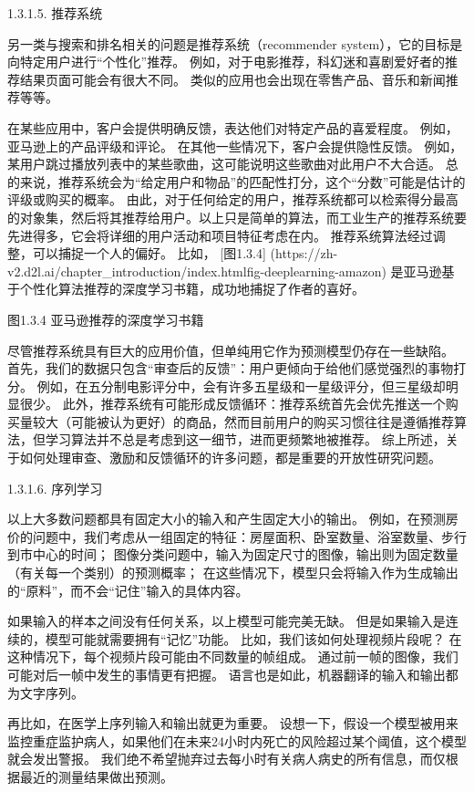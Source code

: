  1.3.1.5. 推荐系统

另一类与搜索和排名相关的问题是推荐系统（recommender system），它的目标是向特定用户进行“个性化”推荐。 例如，对于电影推荐，科幻迷和喜剧爱好者的推荐结果页面可能会有很大不同。 类似的应用也会出现在零售产品、音乐和新闻推荐等等。

在某些应用中，客户会提供明确反馈，表达他们对特定产品的喜爱程度。 例如，亚马逊上的产品评级和评论。 在其他一些情况下，客户会提供隐性反馈。 例如，某用户跳过播放列表中的某些歌曲，这可能说明这些歌曲对此用户不大合适。 总的来说，推荐系统会为“给定用户和物品”的匹配性打分，这个“分数”可能是估计的评级或购买的概率。 由此，对于任何给定的用户，推荐系统都可以检索得分最高的对象集，然后将其推荐给用户。以上只是简单的算法，而工业生产的推荐系统要先进得多，它会将详细的用户活动和项目特征考虑在内。 推荐系统算法经过调整，可以捕捉一个人的偏好。 比如， [图1.3.4]
(https://zh-v2.d2l.ai/chapter\_introduction/index.htmlfig-deeplearning-amazon) 
是亚马逊基于个性化算法推荐的深度学习书籍，成功地捕捉了作者的喜好。


图1.3.4 亚马逊推荐的深度学习书籍

尽管推荐系统具有巨大的应用价值，但单纯用它作为预测模型仍存在一些缺陷。 首先，我们的数据只包含“审查后的反馈”：用户更倾向于给他们感觉强烈的事物打分。 例如，在五分制电影评分中，会有许多五星级和一星级评分，但三星级却明显很少。 此外，推荐系统有可能形成反馈循环：推荐系统首先会优先推送一个购买量较大（可能被认为更好）的商品，然而目前用户的购买习惯往往是遵循推荐算法，但学习算法并不总是考虑到这一细节，进而更频繁地被推荐。 综上所述，关于如何处理审查、激励和反馈循环的许多问题，都是重要的开放性研究问题。

 1.3.1.6. 序列学习

以上大多数问题都具有固定大小的输入和产生固定大小的输出。 例如，在预测房价的问题中，我们考虑从一组固定的特征：房屋面积、卧室数量、浴室数量、步行到市中心的时间； 图像分类问题中，输入为固定尺寸的图像，输出则为固定数量（有关每一个类别）的预测概率； 在这些情况下，模型只会将输入作为生成输出的“原料”，而不会“记住”输入的具体内容。

如果输入的样本之间没有任何关系，以上模型可能完美无缺。 但是如果输入是连续的，模型可能就需要拥有“记忆”功能。 比如，我们该如何处理视频片段呢？ 在这种情况下，每个视频片段可能由不同数量的帧组成。 通过前一帧的图像，我们可能对后一帧中发生的事情更有把握。 语言也是如此，机器翻译的输入和输出都为文字序列。

再比如，在医学上序列输入和输出就更为重要。 设想一下，假设一个模型被用来监控重症监护病人，如果他们在未来24小时内死亡的风险超过某个阈值，这个模型就会发出警报。 我们绝不希望抛弃过去每小时有关病人病史的所有信息，而仅根据最近的测量结果做出预测。

